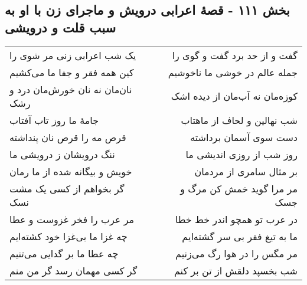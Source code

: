 \begin{center}
\section*{بخش ۱۱۱ - قصهٔ اعرابی درویش و ماجرای زن با او به سبب قلت و درویشی}
\label{sec:sh111}
\begin{longtable}{l p{0.5cm} r}
یک شب اعرابی زنی مر شوی را
&&
گفت و از حد برد گفت و گوی را
\\
کین همه فقر و جفا ما می‌کشیم
&&
جمله عالم در خوشی ما ناخوشیم
\\
نان‌مان نه نان خورش‌مان درد و رشک
&&
کوزه‌مان نه آب‌مان از دیده اشک
\\
جامهٔ ما روز تاب آفتاب
&&
شب نهالین و لحاف از ماهتاب
\\
قرص مه را قرص نان پنداشته
&&
دست سوی آسمان برداشته
\\
ننگ درویشان ز درویشی ما
&&
روز شب از روزی اندیشی ما
\\
خویش و بیگانه شده از ما رمان
&&
بر مثال سامری از مردمان
\\
گر بخواهم از کسی یک مشت نسک
&&
مر مرا گوید خمش کن مرگ و جسک
\\
مر عرب را فخر غزوست و عطا
&&
در عرب تو همچو اندر خط خطا
\\
چه غزا ما بی‌غزا خود کشته‌ایم
&&
ما به تیغ فقر بی سر گشته‌ایم
\\
چه عطا ما بر گدایی می‌تنیم
&&
مر مگس را در هوا رگ می‌زنیم
\\
گر کسی مهمان رسد گر من منم
&&
شب بخسپد دلقش از تن بر کنم
\\
\end{longtable}
\end{center}
